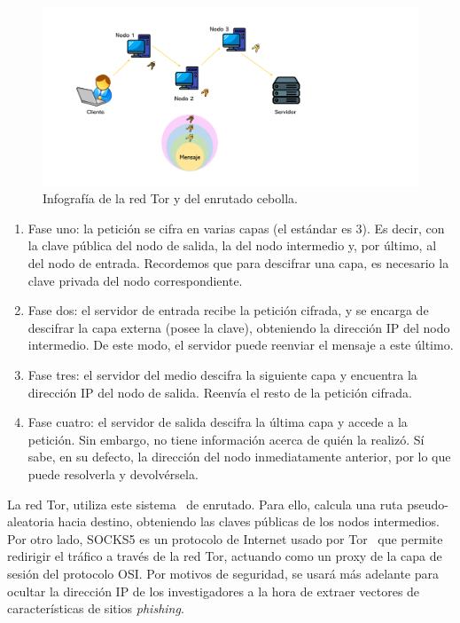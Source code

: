 \begin{figure}[h]
	\caption[Enrutado cebolla.]{Infografía de la red Tor y del enrutado cebolla.}
	\label{img:red_tor}
	\centering
	\includegraphics[width=\textwidth]{../img/memoria/3_onion_routing.pdf}
\end{figure}

\begin{enumerate}
	\item Fase uno: la petición se cifra en varias capas (el estándar es 3). Es decir, con la clave pública del nodo de salida, la del nodo intermedio y, por último, al del nodo de entrada. Recordemos que para descifrar una capa, es necesario la clave privada del nodo correspondiente.
	\item Fase dos: el servidor de entrada recibe la petición cifrada, y se encarga de descifrar la capa externa (posee la clave), obteniendo la dirección IP del nodo intermedio. De este modo, el servidor puede reenviar el mensaje a este último.
	\item Fase tres: el servidor del medio descifra la siguiente capa y encuentra la dirección IP del nodo de salida. Reenvía el resto de la petición cifrada.
	\item Fase cuatro: el servidor de salida descifra la última capa y accede a la petición. Sin embargo, no tiene información acerca de quién la realizó. Sí sabe, en su defecto, la dirección del nodo inmediatamente anterior, por lo que puede resolverla y devolvérsela.
\end{enumerate}

La red Tor, utiliza este sistema~\cite{TorAndrea2022} de enrutado. Para ello, calcula una ruta pseudo-aleatoria hacia destino, obteniendo las claves públicas de los nodos intermedios. Por otro lado, SOCKS5 es un protocolo de Internet usado por Tor~\cite{SOCKS5Tor2022} que permite redirigir el tráfico a través de la red Tor, actuando como un proxy de la capa de sesión del protocolo OSI. Por motivos de seguridad, se usará más adelante para ocultar la dirección IP de los investigadores a la hora de extraer vectores de características de sitios \textit{phishing}.

